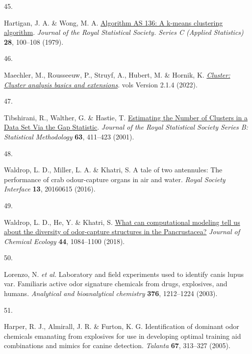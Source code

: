 \documentclass[
]{article}
\newlength{\cslhangindent}
\newlength{\csllabelwidth}
\newlength{\cslentryspacingunit} %
\newenvironment{CSLReferences}[2] %
 {%
  \setlength{\parindent}{0pt}
  \ifodd #1
  \let\oldpar\par
  \def\par{\hangindent=\cslhangindent\oldpar}
  \fi
  \setlength{\parskip}{#2\cslentryspacingunit}
 }%
 {}
\newcommand{\CSLLeftMargin}[1]{\parbox[t]{\csllabelwidth}{#1}}
\newcommand{\CSLRightInline}[1]{\parbox[t]{\linewidth - \csllabelwidth}{#1}\break}
\begin{document}
\begin{CSLReferences}{0}{0}
\leavevmode{}%
\CSLLeftMargin{45. }%
\CSLRightInline{Hartigan, J. A. \& Wong, M. A. \href{http://www.jstor.org/stable/2346830}{Algorithm AS 136: A k-means clustering algorithm}. \emph{Journal of the Royal Statistical Society. Series C (Applied Statistics)} \textbf{28}, 100--108 (1979).}

\leavevmode{}%
\CSLLeftMargin{46. }%
\CSLRightInline{Maechler, M., Rousseeuw, P., Struyf, A., Hubert, M. \& Hornik, K. \emph{\href{https://CRAN.R-project.org/package=cluster}{Cluster: Cluster analysis basics and extensions}}. vols Version 2.1.4 (2022).}

\leavevmode{}%
\CSLLeftMargin{47. }%
\CSLRightInline{Tibshirani, R., Walther, G. \& Hastie, T. \href{https://doi.org/10.1111/1467-9868.00293}{Estimating the {Number} of {Clusters} in a {Data} {Set} {Via} the {Gap} {Statistic}}. \emph{Journal of the Royal Statistical Society Series B: Statistical Methodology} \textbf{63}, 411--423 (2001).}

\leavevmode{}%
\CSLLeftMargin{48. }%
\CSLRightInline{Waldrop, L. D., Miller, L. A. \& Khatri, S. A tale of two antennules: The performance of crab odour-capture organs in air and water. \emph{Royal Society Interface} \textbf{13}, 20160615 (2016).}

\leavevmode{}%
\CSLLeftMargin{49. }%
\CSLRightInline{Waldrop, L. D., He, Y. \& Khatri, S. \href{https://doi.org/10.1007/s10886-018-1017-2}{What can computational modeling tell us about the diversity of odor-capture structures in the {P}ancrustacea?} \emph{Journal of Chemical Ecology} \textbf{44}, 1084--1100 (2018).}

\leavevmode{}%
\CSLLeftMargin{50. }%
\CSLRightInline{Lorenzo, N. \emph{et al.} Laboratory and field experiments used to identify canis lupus var. Familiaris active odor signature chemicals from drugs, explosives, and humans. \emph{Analytical and bioanalytical chemistry} \textbf{376}, 1212--1224 (2003).}

\leavevmode{}%
\CSLLeftMargin{51. }%
\CSLRightInline{Harper, R. J., Almirall, J. R. \& Furton, K. G. Identification of dominant odor chemicals emanating from explosives for use in developing optimal training aid combinations and mimics for canine detection. \emph{Talanta} \textbf{67}, 313--327 (2005).}


\end{CSLReferences}
\end{document}
